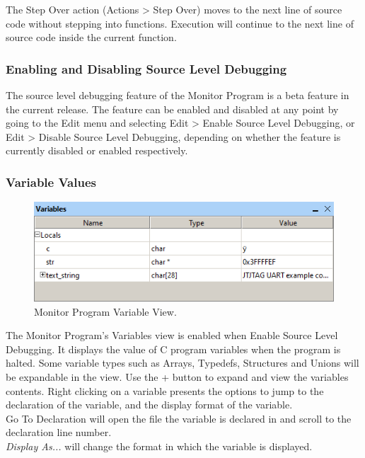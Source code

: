 \documentclass[11pt, twoside, pdftex]{article}
\begin{document}
The Step Over action ({\sf Actions > Step Over}) moves to the next line of source code without stepping into functions. 
Execution will continue to the next line of source code inside the current function.


\subsubsection{Enabling and Disabling Source Level Debugging}
The source level debugging feature of the Monitor Program is a beta feature in the current release. The feature can be enabled and disabled at any point by going to the {\sf Edit} menu and selecting {\sf Edit > Enable Source Level Debugging}, or {\sf Edit > Disable Source Level Debugging}, depending on whether the feature is currently disabled or enabled respectively.


\subsubsection{Variable Values}

\begin{figure}[h]
   \begin{center}
      \includegraphics[scale=0.7]{screenshots/figure30.png}
   \end{center}
   \caption{Monitor Program Variable View.}
	 \label{fig:30}
\end{figure}

The Monitor Program's {\sf Variables} view is enabled when {\sf Enable Source Level Debugging}. It displays the value of C program variables when the program is halted.
Some variable types such as Arrays,  Typedefs, Structures and Unions will be expandable in the view. Use the {\sf +} button to 
expand and view the variables contents. Right clicking on a variable presents the options to jump to the declaration of the variable,
and the display format of the variable.\\

{\sf Go To Declaration} will open the file the variable is declared in and scroll to the declaration line number.\\
{\it Display As...} will change the format in which the variable is displayed.\\
\end{document}
